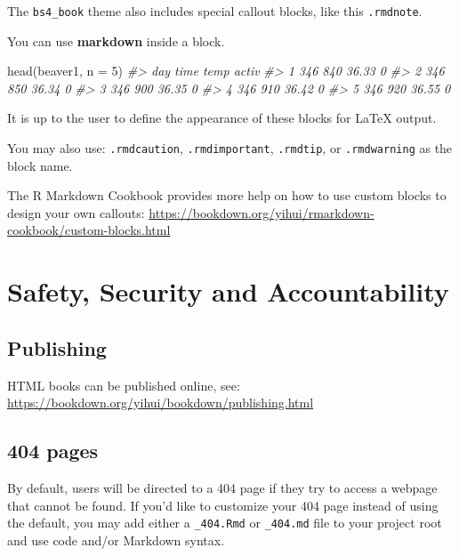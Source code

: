 \documentclass[
]{book}
\newenvironment{Shaded}{\begin{snugshade}}{\end{snugshade}}
\newcommand{\AttributeTok}[1]{\textcolor[rgb]{0.77,0.63,0.00}{#1}}
\newcommand{\CommentTok}[1]{\textcolor[rgb]{0.56,0.35,0.01}{\textit{#1}}}
\newcommand{\DecValTok}[1]{\textcolor[rgb]{0.00,0.00,0.81}{#1}}
\newcommand{\FunctionTok}[1]{\textcolor[rgb]{0.00,0.00,0.00}{#1}}
\newcommand{\NormalTok}[1]{#1}
\theoremstyle{definition}
\theoremstyle{definition}
\theoremstyle{definition}
\theoremstyle{definition}
\theoremstyle{remark}
\begin{document}
The \texttt{bs4\_book} theme also includes special callout blocks, like this \texttt{.rmdnote}.

You can use \textbf{markdown} inside a block.

\begin{Shaded}
\begin{Highlighting}[]
\FunctionTok{head}\NormalTok{(beaver1, }\AttributeTok{n =} \DecValTok{5}\NormalTok{)}
\CommentTok{\#\textgreater{}   day time  temp activ}
\CommentTok{\#\textgreater{} 1 346  840 36.33     0}
\CommentTok{\#\textgreater{} 2 346  850 36.34     0}
\CommentTok{\#\textgreater{} 3 346  900 36.35     0}
\CommentTok{\#\textgreater{} 4 346  910 36.42     0}
\CommentTok{\#\textgreater{} 5 346  920 36.55     0}
\end{Highlighting}
\end{Shaded}

It is up to the user to define the appearance of these blocks for LaTeX output.

You may also use: \texttt{.rmdcaution}, \texttt{.rmdimportant}, \texttt{.rmdtip}, or \texttt{.rmdwarning} as the block name.

The R Markdown Cookbook provides more help on how to use custom blocks to design your own callouts: \url{https://bookdown.org/yihui/rmarkdown-cookbook/custom-blocks.html}

\hypertarget{ch-safety}{%
\chapter{Safety, Security and Accountability}\label{ch-safety}}

\hypertarget{publishing}{%
\section{Publishing}\label{publishing}}

HTML books can be published online, see: \url{https://bookdown.org/yihui/bookdown/publishing.html}

\hypertarget{pages}{%
\section{404 pages}\label{pages}}

By default, users will be directed to a 404 page if they try to access a webpage that cannot be found. If you'd like to customize your 404 page instead of using the default, you may add either a \texttt{\_404.Rmd} or \texttt{\_404.md} file to your project root and use code and/or Markdown syntax.
\end{document}
